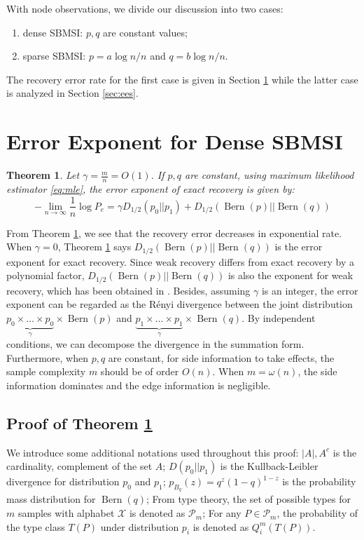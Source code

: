\documentclass[conference,letterpaper]{IEEEtran}
\newtheorem{theorem}{Theorem}
\DeclareMathOperator{\Bern}{Bern}
\begin{document}
With node observations, we divide our discussion into two cases:
\begin{enumerate}
	\item dense SBMSI: $p,q$ are constant values;
\item sparse SBMSI: $p = a \log n /n$ and $q = b \log n / n$.
\end{enumerate}
The recovery error rate for the first case is given in Section \ref{sec:ee} while
the latter case is analyzed in Section \ref{sec:ees}.
\section{Error Exponent for Dense SBMSI}\label{sec:ee}
\begin{theorem}\label{thm:constant}
	Let $\gamma = \frac{m}{n} = O(1)$. If $p,q$ are constant, using maximum likelihood estimator \eqref{eq:mle},
	the error exponent of exact recovery is given by:
	\begin{equation}
	-\lim_{n\to \infty} \frac{1}{n}\log P_e =  \gamma D_{1/2}(p_0 || p_1) + D_{1/2}(\Bern(p)||\Bern(q))
	\end{equation} 
\end{theorem}
From Theorem \ref{thm:constant}, we see that the recovery error decreases in exponential rate.
When $\gamma=0$, Theorem \ref{thm:constant} says $D_{1/2}(\Bern(p)||\Bern(q))$
is the error exponent for exact recovery. Since weak recovery differs from exact recovery by a polynomial factor, $D_{1/2}(\Bern(p)||\Bern(q))$ is also the exponent for weak recovery, which has been obtained
in \cite{zhang2016}.
Besides, assuming $\gamma$ is an integer, the error exponent can be regarded as the Rényi divergence between the joint distribution
$\underbrace{p_0\times \dots \times p_0}_{\gamma} \times \Bern(p)$ and $\underbrace{p_1\times \dots \times p_1}_{\gamma} \times \Bern(q)$. By independent conditions, we can decompose the
divergence in the summation form.
Furthermore, when $p,q$ are constant, for side information to take effects, the sample complexity $m$ should be of order $O(n)$. When $m=\omega(n)$, the side information dominates and the edge information is negligible.

\subsection{Proof of Theorem \ref{thm:constant}}
We introduce some additional notations used throughout this proof:
$|A|, A^c$ is the cardinality, complement of the set $A$;
$D(p_0 || p_1)$ is the Kullback-Leibler divergence
for distribution $p_0$ and $p_1$;
$p_{B_q}(z) = q^z(1-q)^{1-z}$ is the probability mass distribution for $\Bern(q)$;
From type theory, the set of possible types
for $m$ samples with alphabet $\mathcal{X}$ is denoted as $\mathcal{P}_m$; For any $P\in \mathcal{P}_m$, the probability of the type
class $T(P)$ under distribution $p_i$ is denoted as $Q_i^{m}(T(P))$.
\end{document}
